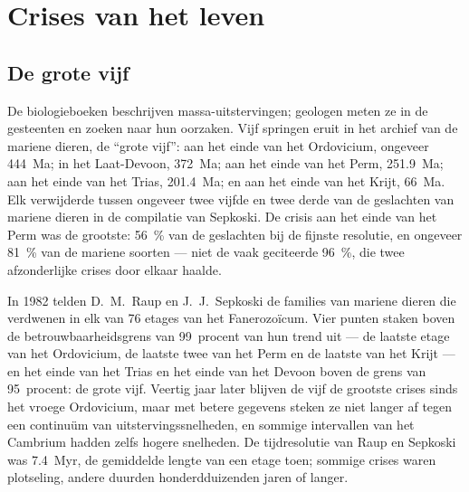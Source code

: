 \section{Crises van het leven}\label{sec:b2:phanerozoic-earth:extinctions}

\subsection*{De grote vijf}

De biologieboeken beschrijven massa-uitstervingen; geologen meten ze in de gesteenten en zoeken naar
hun oorzaken. Vijf springen eruit in het archief van de mariene dieren, de ``grote vijf'': aan het einde van het
Ordovicium, ongeveer \qty{444}{Ma}; in het Laat-Devoon, \qty{372}{Ma}; aan het einde van het Perm,
\qty{251.9}{Ma}; aan het einde van het Trias, \qty{201.4}{Ma}; en aan het einde van het Krijt,
\qty{66}{Ma}. Elk verwijderde tussen ongeveer twee vijfde en twee derde van de geslachten van mariene
dieren in de compilatie van Sepkoski. De crisis aan het einde van het Perm was de grootste: \qty{56}{\percent} van de
geslachten bij de fijnste resolutie, en ongeveer \qty{81}{\percent} van de mariene soorten --- niet de
vaak geciteerde \qty{96}{\percent}, die twee afzonderlijke crises door elkaar haalde.

\begin{history}
In 1982 telden D.~M.~Raup en J.~J.~Sepkoski de families van mariene dieren die verdwenen
in elk van 76 etages van het Fanerozoïcum. Vier punten staken boven de betrouwbaarheidsgrens van 99~procent
van hun trend uit --- de laatste etage van het Ordovicium, de laatste twee van het Perm en de laatste van
het Krijt --- en het einde van het Trias en het einde van het Devoon boven de grens van 95~procent:
de grote vijf. Veertig jaar later blijven de vijf de grootste crises sinds het vroege
Ordovicium, maar met betere gegevens steken ze niet langer af tegen een continuüm van
uitstervingssnelheden, en sommige intervallen van het Cambrium hadden zelfs hogere snelheden. De tijdresolutie van Raup en Sepkoski
was \qty{7.4}{Myr}, de gemiddelde lengte van een etage toen; sommige crises waren plotseling, andere
duurden honderdduizenden jaren of langer.
\end{history}

